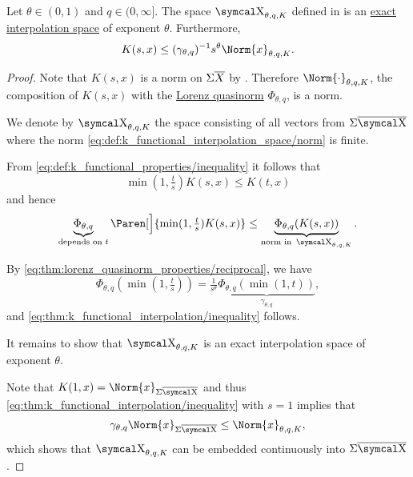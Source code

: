 \begin{theorem}\label{thm:k_functional_interpolation}
  Let \( \theta \in (0, 1) \) and \( q \in (0, \infty] \). The space \( \CX_{\theta,q,K} \) defined in  is an \hyperref[def:banach_interpolation_space_exponent]{exact interpolation space} of exponent \( \theta \). Furthermore,
  \begin{equation}\label{eq:thm:k_functional_interpolation/inequality}
    K(s, x) \leq (\gamma_{\theta,q})^{-1} s^\theta \Norm{x}_{\theta,q,K}.
  \end{equation}
\end{theorem}
\begin{proof}
  Note that \( K(s, x) \) is a norm on \( \Sigma \overline{X} \) by . Therefore \( \Norm{\cdot}_{\theta,q,K} \), the composition of \( K(s, x) \) with the \hyperref[def:lorenz_quasinorm]{Lorenz quasinorm} \( \Phi_{\theta,q} \), is a norm.

  We denote by \( \CX_{\theta,q,K} \) the space consisting of all vectors from \( \Sigma \Ol{\CX} \) where the norm \eqref{eq:def:k_functional_interpolation_space/norm} is finite.

  From \eqref{eq:def:k_functional_properties/inequality} it follows that
  \begin{equation*}
    \min(1, \tfrac t s) K(s, x) \leq K(t, x)
  \end{equation*}
  and hence
  \begin{equation*}
    \underbrace{\Phi_{\theta,q}}_{\text{depends on } t} \Paren[\Big]{ \min(1, \tfrac t s) K(s, x) } \leq \underbrace{\Phi_{\theta,q}(K(s, x))}_{\text{norm in } \CX_{\theta,q,K}}.
  \end{equation*}

  By \eqref{eq:thm:lorenz_quasinorm_properties/reciprocal}, we have
  \begin{equation*}
    \Phi_{\theta,q}(\min(1, \tfrac t s)) = \tfrac 1 {s^\theta} \underbrace{\Phi_{\theta,q}(\min(1, t))}_{\hyperref[eq:def:lorenz_quasinorm/gamma]{\gamma_{\theta,q}}},
  \end{equation*}
  and \eqref{eq:thm:k_functional_interpolation/inequality} follows.

  It remains to show that \( \CX_{\theta,q,K} \) is an exact interpolation space of exponent \( \theta \).

  Note that \( K(1, x) = \Norm{x}_{\Sigma \Ol{\CX}} \) and thus \eqref{eq:thm:k_functional_interpolation/inequality} with \( s = 1 \) implies that
  \begin{equation*}
    \gamma_{\theta,q} \Norm{x}_{\Sigma \Ol{\CX}} \leq \Norm{x}_{\theta,q,K},
  \end{equation*}
  which shows that \( \CX_{\theta,q,K} \) can be embedded continuously into \( \Sigma \Ol{\CX} \).


\end{proof}
